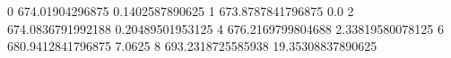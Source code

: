 0 674.01904296875 0.1402587890625
1 673.8787841796875 0.0
2 674.0836791992188 0.20489501953125
4 676.2169799804688 2.33819580078125
6 680.9412841796875 7.0625
8 693.2318725585938 19.35308837890625
